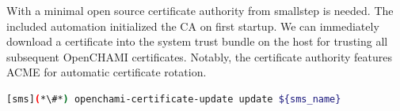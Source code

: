 With \OpenCHAMI{} a minimal open source certificate authority from smallstep is needed. The included automation initialized the CA on first startup. We can immediately download a certificate into the system trust bundle on the host for trusting all subsequent OpenCHAMI certificates. Notably, the certificate authority features ACME for automatic certificate rotation.

\begin{lstlisting}[language=bash,keywords={}]
[sms](*\#*) openchami-certificate-update update ${sms_name}
\end{lstlisting}
